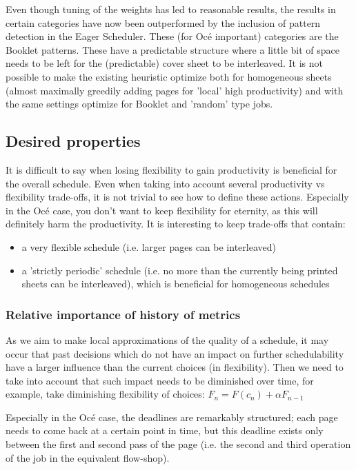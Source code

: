 \documentclass[]{article}
\begin{document}
Even though tuning of the weights has led to reasonable results, the results in certain categories have now been outperformed by the inclusion of pattern detection in the Eager Scheduler. These (for Oc\'e important) categories are the Booklet patterns. These have a predictable structure where a little bit of space needs to be left for the (predictable) cover sheet to be interleaved. It is not possible to make the existing heuristic optimize both for homogeneous sheets (almost maximally greedily adding pages for 'local' high productivity) and with the same settings optimize for Booklet and 'random' type jobs.

\subsection{Desired properties}

It is difficult to say when losing flexibility to gain productivity is beneficial for the overall schedule. Even when taking into account several productivity vs flexibility trade-offs, it is not trivial to see how to define these actions. Especially in the Oc\'e case, you don't want to keep flexibility for eternity, as this will definitely harm the productivity. It is interesting to keep trade-offs that contain: 
\begin{itemize}
\item a very flexible schedule (i.e. larger pages can be interleaved)
\item a 'strictly periodic' schedule (i.e. no more than the currently being printed sheets can be interleaved), which is beneficial for homogeneous schedules
\end{itemize}


\subsubsection{Relative importance of history of metrics}
As we aim to make local approximations of the quality of a schedule, it may occur that past decisions which do not have an impact on further schedulability have a larger influence than the current choices (in flexibility). Then we need to take into account that such impact needs to be diminished over time, for example, take diminishing flexibility of choices:
$F_n = F(c_n) + \alpha F_{n-1}$ 

Especially in the Oc\'e case, the deadlines are remarkably structured; each page needs to come back at a certain point in time, but this deadline exists only between the first and second pass of the page (i.e. the second and third operation of the job in the equivalent flow-shop).
\end{document}
